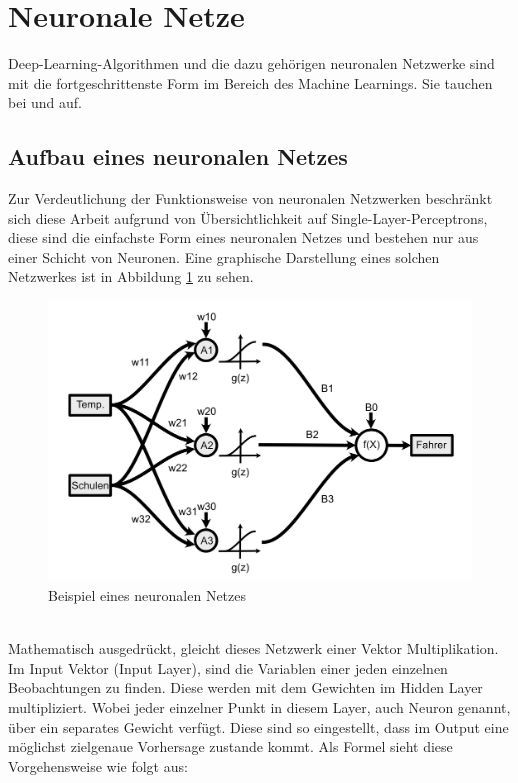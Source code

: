 \documentclass[a4paper,12pt]{thesis}
\begin{document}
\section{Neuronale Netze}

Deep-Learning-Algorithmen und die dazu gehörigen neuronalen Netzwerke sind mit die fortgeschrittenste Form im Bereich des Machine Learnings. Sie tauchen bei \cite{Broucke2019} und \cite{Mitchell2018PredictingBT} auf.

\subsection{Aufbau eines neuronalen Netzes}

Zur Verdeutlichung der Funktionsweise von neuronalen Netzwerken beschränkt sich diese Arbeit aufgrund von Übersichtlichkeit auf Single-Layer-Perceptrons, diese sind die einfachste Form eines neuronalen Netzes und bestehen nur aus einer Schicht von Neuronen. Eine graphische Darstellung eines solchen Netzwerkes ist in Abbildung \ref{NN1} zu sehen.
\begin{figure}[!ht]
	\centering
	\includegraphics[width=14cm]{Plots/Neural_Networks.png}
	\caption{Beispiel eines neuronalen Netzes}
	\label{NN1}
\end{figure}\\
Mathematisch ausgedrückt, gleicht dieses Netzwerk einer Vektor Multiplikation. Im Input Vektor (Input Layer), sind die Variablen einer jeden einzelnen Beobachtungen zu finden. Diese werden mit dem Gewichten im Hidden Layer multipliziert. Wobei jeder einzelner Punkt in diesem Layer, auch Neuron genannt, über ein separates Gewicht verfügt. Diese sind so eingestellt, dass im Output eine möglichst zielgenaue Vorhersage zustande kommt. Als Formel sieht diese Vorgehensweise wie folgt aus:
\end{document}

